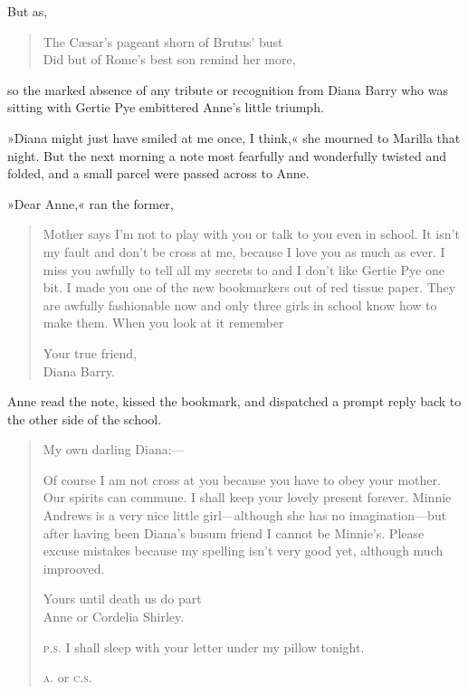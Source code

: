 But as,

\begin{verse}
The Cæsar’s pageant shorn of Brutus’ bust\\
Did but of Rome’s best son remind her more,
\end{verse}

so the marked absence of any tribute or recognition from Diana Barry who was sitting with Gertie Pye embittered Anne’s little triumph.

»Diana might just have smiled at me once, I think,« she mourned to Marilla that night. But the next morning a note most fearfully and wonderfully twisted and folded, and a small parcel were passed across to Anne.

»Dear Anne,« ran the former,
\begin{quotation}
\indent Mother says I’m not to play with you or talk to you even in school. It isn’t my fault and don’t be cross at me, because I love you as much as ever. I miss you awfully to tell all my secrets to and I don’t like Gertie Pye one bit. I made you one of the new bookmarkers out of red tissue paper. They are awfully fashionable now and only three girls in school know how to make them. When you look at it remember

\begin{flushright}
Your true friend,\\
Diana Barry.
\end{flushright}
\end{quotation}

Anne read the note, kissed the bookmark, and dispatched a prompt reply back to the other side of the school.

\begin{quotation}
\noindent My own darling Diana:—

\indent Of course I am not cross at you because you have to obey your mother. Our spirits can commune. I shall keep your lovely present forever. Minnie Andrews is a very nice little girl—although she has no imagination—but after having been Diana’s busum friend I cannot be Minnie’s. Please excuse mistakes because my spelling isn’t very good yet, although much improoved.
\begin{flushright}
Yours until death us do part\\
Anne or Cordelia Shirley.
\end{flushright}


\noindent \textsc{p.s.} I shall sleep with your letter under my pillow tonight.

\textsc{a.} or \textsc{c.s.}
\end{quotation}

